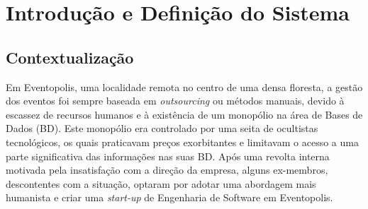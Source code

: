\documentclass[a4paper,12pt]{scrreprt}
\begin{document}
\pagebreak



\renewcommand{\contentsname}{Índice}

\tableofcontents

\pagebreak

\listoffigures

\pagebreak

\listoftables

\pagebreak





\chapter{Introdução e Definição do Sistema}
     \section{Contextualização}

     Em Eventopolis, uma localidade remota no centro de uma densa floresta,
     a gestão dos eventos foi sempre baseada em \textit{outsourcing} ou métodos manuais,
     devido à escassez de recursos humanos e à existência de um monopólio na área de Bases
     de Dados (BD). Este monopólio era controlado por uma seita de ocultistas tecnológicos,
     os quais praticavam preços exorbitantes e limitavam o acesso a uma parte significativa
     das informações nas suas BD. Após uma revolta interna motivada pela insatisfação com a
     direção da empresa, alguns ex-membros, descontentes com a situação, optaram por adotar
     uma abordagem mais humanista e criar uma \textit{start-up} de Engenharia de Software em Eventopolis.
    
\end{document}
